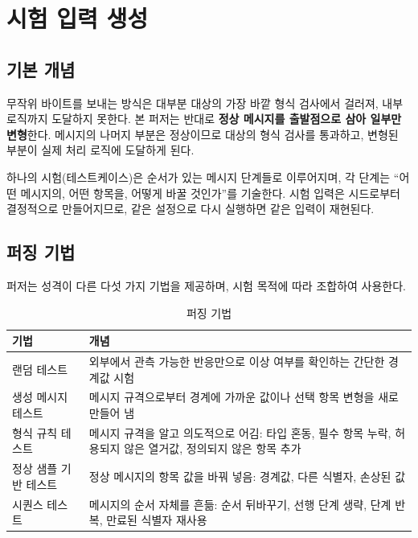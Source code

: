 \clearpage

\section{시험 입력 생성}\label{sec:engine}

\subsection{기본 개념}

무작위 바이트를 보내는 방식은 대부분 대상의 가장 바깥 형식 검사에서 걸러져, 내부 로직까지 도달하지 못한다.
본 퍼저는 반대로 \textbf{정상 메시지를 출발점으로 삼아 일부만 변형}한다.
메시지의 나머지 부분은 정상이므로 대상의 형식 검사를 통과하고, 변형된 부분이 실제 처리 로직에 도달하게 된다.

하나의 시험(테스트케이스)은 순서가 있는 메시지 단계들로 이루어지며, 각 단계는 ``어떤 메시지의, 어떤 항목을, 어떻게 바꿀 것인가''를 기술한다.
시험 입력은 시드로부터 결정적으로 만들어지므로, 같은 설정으로 다시 실행하면 같은 입력이 재현된다.

\subsection{퍼징 기법}

퍼저는 성격이 다른 다섯 가지 기법을 제공하며, 시험 목적에 따라 조합하여 사용한다.

\begin{table}[H]
\centering
\small
\caption{퍼징 기법}
\label{tab:techniques}
\begin{tabularx}{\textwidth}{l Y}
\toprule
\textbf{기법} & \textbf{개념} \\
\midrule
랜덤 테스트 & 외부에서 관측 가능한 반응만으로 이상 여부를 확인하는 간단한 경계값 시험 \\
생성 메시지 테스트 & 메시지 규격으로부터 경계에 가까운 값이나 선택 항목 변형을 새로 만들어 냄 \\
형식 규칙 테스트 & 메시지 규격을 알고 의도적으로 어김: 타입 혼동, 필수 항목 누락, 허용되지 않은 열거값, 정의되지 않은 항목 추가 \\
정상 샘플 기반 테스트 & 정상 메시지의 항목 값을 바꿔 넣음: 경계값, 다른 식별자, 손상된 값 \\
시퀀스 테스트 & 메시지의 순서 자체를 흔듦: 순서 뒤바꾸기, 선행 단계 생략, 단계 반복, 만료된 식별자 재사용 \\
\bottomrule
\end{tabularx}
\end{table}


